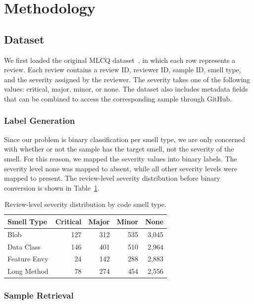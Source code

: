 \section{Methodology}
\label{sec:methodology}

\subsection{Dataset}
\label{subsec:dataset}

We first loaded the original MLCQ dataset~\cite{madeyski2020mlcq}, in which each row represents a review. Each review contains a review ID, reviewer ID, sample ID, smell type, and the severity assigned by the reviewer. The severity takes one of the following values: critical, major, minor, or none. The dataset also includes metadata fields that can be combined to access the corresponding sample through GitHub.

\subsubsection{Label Generation}

Since our problem is binary classification per smell type, we are only concerned with whether or not the sample has the target smell, not the severity of the smell. For this reason, we mapped the severity values into binary labels. The severity level none was mapped to absent, while all other severity levels were mapped to present. The review-level severity distribution before binary conversion is shown in Table~\ref{tab:severity-distribution}.

\begin{table}[t]
\caption{Review-level severity distribution by code smell type.}
\label{tab:severity-distribution}
\centering
\begin{tabular}{lrrrr}
\hline
Smell Type & Critical & Major & Minor & None \\
\hline
Blob & 127 & 312 & 535 & 3,045 \\
Data Class & 146 & 401 & 510 & 2,964 \\
Feature Envy & 24 & 142 & 288 & 2,883 \\
Long Method & 78 & 274 & 454 & 2,556 \\
\hline
\end{tabular}
\end{table}

\subsubsection{Sample Retrieval}

